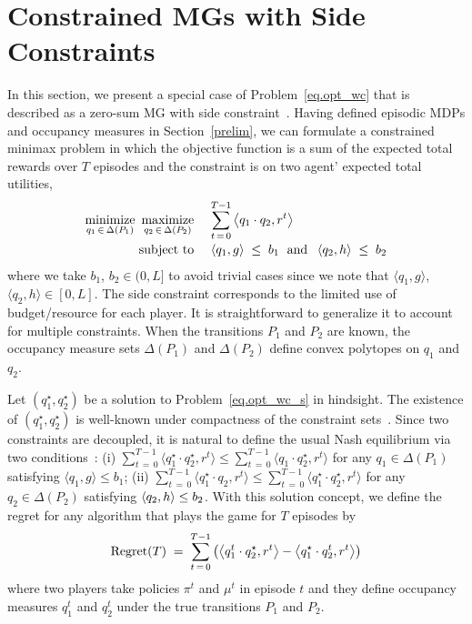 \documentclass[12pt, final]{l4dc2023}
\begin{document}
\section{Constrained MGs with Side Constraints}
\label{ap.CMG_sc}

In this section, we present a special case of Problem~\eqref{eq.opt_wc} that is described as a zero-sum MG with side constraint~\citep{singh2014characterization}. 
Having defined episodic MDPs and occupancy measures in Section~\ref{prelim}, we can formulate a constrained minimax problem in which the objective function is a sum of the expected total rewards over $T$ episodes and the constraint is on two agent' expected total utilities, 
\begin{equation}\label{eq.opt_wc_s}
\begin{array}{rcl}
\minimize\limits_{q_1\,\in\,\Delta(P_1)} \,\,\maximize\limits_{q_2\,\in\,\Delta(P_2)} &&\!\!\!\! \displaystyle \sum_{t\,=\,0}^{T-1} \inner{q_1\cdot q_2}{r^t} 
\\[0.4cm]
\subject &&\!\!\!\!
\inner{q_1}{g} \;\leq\; b_1
\; \text{ and } \;
\inner{q_2}{h}\;\leq\; b_2
\end{array}
\end{equation}
where we take $b_1$, $b_2\in (0, L]$ to avoid trivial cases since we note that $\langle{q_1},{g}\rangle$, $\langle{q_2},{h}\rangle\in [0,L]$. The side constraint corresponds to the limited use of budget/resource for each player. It is straightforward to generalize it to account for multiple constraints. When the transitions $P_1$ and $P_2$ are known, the occupancy measure sets $\Delta(P_1)$ and $\Delta(P_2)$ define convex polytopes on $q_1$ and $q_2$. 

Let $(q_1^\star,q_2^\star)$ be a solution to Problem~\eqref{eq.opt_wc_s} in hindsight. The existence of $(q_1^\star,q_2^\star)$ is well-known under compactness of the constraint sets~\citep{neumann1928theorie,rosen1965existence}. Since two constraints are decoupled, it is natural to define the usual Nash equilibrium via two conditions~\citep{altman2000constrained,daskalakis2020complexity}: (i) $ \sum_{t\,=\,0}^{T-1}\langle q_1^\star\cdot q_2^\star, r^t \rangle \leq \sum_{t\,=\,0}^{T-1} \langle q_1\cdot q_2^\star, r^t \rangle$ for any $q_1 \in \Delta(P_1)$ satisfying $\langle{q_1},{g}\rangle \leq b_1$; (ii) $\sum_{t\,=\,0}^{T-1}\langle q_1^\star\cdot q_2, r^t \rangle \leq \sum_{t\,=\,0}^{T-1}\langle q_1^\star\cdot q_2^\star, r^t \rangle$ for any $q_2\in\Delta(P_2)$ satisfying $\left\langle q_2,h \right\rangle\leq b_2$. 
With this solution concept, we define the regret for any algorithm that plays the game for $T$ episodes by 
\begin{equation}\label{eq.regret_s}
\text{Regret}(T) \;=\; \sum_{t\,=\,0}^{T-1} \left( \left\langle q_1^t \cdot q_2^\star,r^t \right\rangle - \left\langle q_1^\star \cdot q_2^t,r^t \right\rangle \right)
\end{equation}
where two players take policies $\pi^t$ and $\mu^t$ in episode $t$ and  they define occupancy measures $q_1^t$ and $q_2^t$ under the true transitions $P_1$ and $P_2$. 
\end{document}
